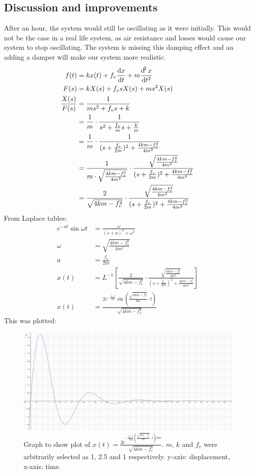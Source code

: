 \documentclass[12pt]{article}
\numberwithin{equation}{section}
\begin{document}
\subsection*{Discussion and improvements}
After an hour, the system would still be oscillating as it were initially. This would not be the case in a real life system, as air resistance and losses would cause our system to stop oscillating. The system is missing this damping effect and an adding a damper will make our system more realistic.
\begin{align}
  f(t) &= kx(t) + f_v \frac{\dif x}{\dif t} + m \frac{\dif ^2 x}{\dif t^2}\\
  F(s) &= kX(s) + f_v s X(s) + m s^2 X(s)\\
  \frac{X(s)}{F(s)} &= \frac{1}{ms^2 + f_v s + k}\\
  &= \frac{1}{m}\cdot \frac{1}{s^2 + \frac{f_v}{m}s + \frac{k}{m}}\\
  &= \frac{1}{m} \cdot \frac{1}{(s+\frac{f_v}{2m})^2 +\frac{4km - f_v^2}{4m^2}}\\
  &= \frac{1}{m \cdot \sqrt{\frac{4km - f_v^2}{4m^2}}} \cdot \frac{\sqrt{\frac{4km - f_v^2}{4m^2}}}{(s+\frac{f_v}{2m})^2 +\frac{4km - f_v^2}{4m^2}}\\
  &= \frac{2}{\sqrt{4km - f_v^2}} \cdot \frac{\sqrt{\frac{4km - f_v^2}{4m^2}}}{(s+\frac{f_v}{2m})^2 +\frac{4km - f_v^2}{4m^2}}
\end{align}
From Laplace tables: 
\begin{align}
  e^{-at}\sin{\omega t} &= \frac{\omega}{(s + a)^2 + \omega^2}\\
  \omega &= \sqrt{\frac{4km - f_v^2}{4m^2}}\\
  a &= \frac{f_v}{2m}\\
  x(t) &= L^{-1} \left[ \frac{2}{\sqrt{4km - f_v^2}} \cdot \frac{\sqrt{\frac{4km - f_v^2}{4m^2}}}{(s+\frac{f_v}{2m})^2 +\frac{4km - f_v^2}{4m^2}} \right]\\
  x(t) &= \frac{2e^{-\frac{f_v \cdot t}{2m}}\sin{\left(\frac{\sqrt{4km-f_v^2 }}{2m} \cdot t\right)}}{\sqrt{4km - f_v^2}}
\end{align}
This was plotted:
\begin{figure}[H]
  \centering
  \includegraphics[width=\textwidth]{./img/3-2timeresponsedamped.png}
  \caption{Graph to show plot of $x(t) = \frac{2e^{-\frac{f_v \cdot t}\sin{\left(\frac{\sqrt{4km-f_v^2 }}{2m} \cdot t\right)}{2m}}}{\sqrt{4km - f_v^2}}$. $m$, $k$ and $f_v$ were arbitrarily selected as 1, 2.5 and 1 respectively. y-axis: displacement, x-axis: time.}
\end{figure}
\end{document}
